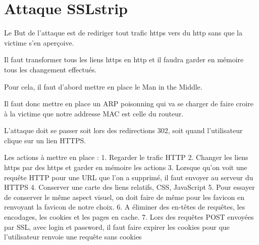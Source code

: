 \chapter{Attaque SSLstrip}

Le But de l'attaque est de rediriger tout trafic https vers du http sans que la victime s'en aperçoive.

Il faut transformer tous les liens https en http et il faudra garder en mémoire tous les changement effectués.

Pour cela, il faut d'abord mettre en place le Man in the Middle.

Il faut donc mettre en place un ARP poisonning qui va se charger de faire croire à la victime que notre addresse MAC est celle du routeur.

L'attaque doit se passer soit lors des redirections 302, soit quand l'utilisateur clique sur un lien HTTPS.

Les actions à mettre en place :
1. Regarder le trafic HTTP
2. Changer les liens https par des https et garder en mémoire les actions
3. Lorsque qu'on voit une requête HTTP pour une URL que l'on a supprimé, il faut envoyer au serveur du HTTPS
4. Conserver une carte des liens relatifs, CSS, JavaScript
5. Pour essayer de conserver le même aspect visuel, on doit faire de même pour les favicon en renvoyant la favicon de notre choix.
6. A éliminer des en-têtes de requêtes, les encodages, les cookies et les pages en cache.
7. Lors des requêtes POST envoyées par SSL, avec login et password, il faut faire expirer les cookies pour que l'utilisateur renvoie une requête sans cookies
